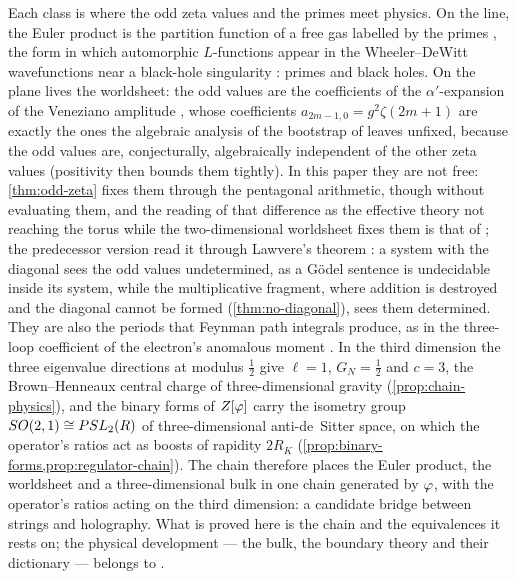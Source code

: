 \begin{remark}\label{rmk:one-two-three}
Each class is where the odd zeta values and the primes meet physics.  On the line, the
Euler product is the partition function of a free gas labelled by the primes
\cite{julia90}, the form in which automorphic $L$-functions appear in the
Wheeler--DeWitt wavefunctions near a black-hole singularity
\cite{hartnollyang25,declerck25}: primes and black holes.  On the plane lives the
worldsheet: the odd values are the coefficients of the $\alpha'$-expansion of the
Veneziano amplitude \cite{veneziano68}, whose coefficients $a_{2m-1,0}=g^2\zeta(2m+1)$ are exactly the ones the algebraic analysis of the bootstrap of \cite{elvang26} leaves unfixed, because the odd values are, conjecturally, algebraically independent of the other zeta values (positivity then bounds them tightly). In this paper they are not free: \cref{thm:odd-zeta} fixes them through the pentagonal arithmetic, though without evaluating them, and the reading of that difference as the effective theory not reaching the torus while the two-dimensional worldsheet fixes them is that of \cite{gonzalez26cw}; the predecessor version \cite{gonzalez26oddzeta} read it through Lawvere's
theorem \cite{lawvere69}: a system with the diagonal sees the odd values undetermined, as a G\"odel sentence is
undecidable inside its system, while the multiplicative fragment, where addition is destroyed and the diagonal
cannot be formed (\cref{thm:no-diagonal}), sees them determined.  They are also the periods that Feynman
path integrals produce, as in the three-loop coefficient of the electron's anomalous
moment \cite{laporta96}.  In the third dimension the three eigenvalue directions at
modulus $\tfrac12$ give $\ell=1$, $G_N=\tfrac12$ and $c=3$, the Brown--Henneaux central
charge of three-dimensional gravity \cite{brownhenneaux86}
(\cref{prop:chain-physics}), and the binary forms of $Z[\varphi]$ carry the isometry group
$SO(2,1)\cong PSL_2(R)$ of three-dimensional anti-de~Sitter space, on which the
operator's ratios act as boosts of rapidity $2R_K$ (\cref{prop:binary-forms,prop:regulator-chain}).  The chain therefore places the
Euler product, the worldsheet and a three-dimensional bulk in one chain generated by
$\varphi$, with the operator's ratios acting on the third dimension: a candidate
bridge between strings and holography.  What is proved here is the chain and the
equivalences it rests on; the physical development --- the bulk, the boundary theory
and their dictionary --- belongs to \cite{gonzalez26cw}.
\end{remark}

